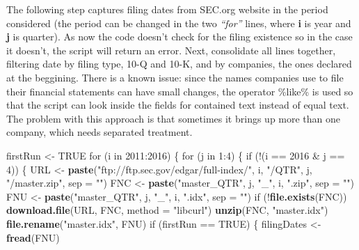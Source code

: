 \documentclass[english,man]{apa6}
\newenvironment{Shaded}{\begin{snugshade}}{\end{snugshade}}
\newcommand{\KeywordTok}[1]{\textcolor[rgb]{0.13,0.29,0.53}{\textbf{{#1}}}}
\newcommand{\DataTypeTok}[1]{\textcolor[rgb]{0.13,0.29,0.53}{{#1}}}
\newcommand{\DecValTok}[1]{\textcolor[rgb]{0.00,0.00,0.81}{{#1}}}
\newcommand{\StringTok}[1]{\textcolor[rgb]{0.31,0.60,0.02}{{#1}}}
\newcommand{\OtherTok}[1]{\textcolor[rgb]{0.56,0.35,0.01}{{#1}}}
\newcommand{\NormalTok}[1]{{#1}}
\begin{document}
The following step captures filing dates from SEC.org website in the
period considered (the period can be changed in the two
\emph{\enquote{for}} lines, where \textbf{i} is year and \textbf{j} is
quarter). As now the code doesn't check for the filing existence so in
the case it doesn't, the script will return an error. Next, consolidate
all lines together, filtering date by filing type, 10-Q and 10-K, and by
companies, the ones declared at the beggining. There is a known issue:
since the names companies use to file their financial statements can
have small changes, the operator \%like\% is used so that the script can
look inside the fields for contained text instead of equal text. The
problem with this approach is that sometimes it brings up more than one
company, which needs separated treatment.

\begin{Shaded}
\begin{Highlighting}[]
\NormalTok{firstRun <-}\StringTok{ }\OtherTok{TRUE}
\NormalTok{for (i in }\DecValTok{2011}\NormalTok{:}\DecValTok{2016}\NormalTok{) \{}
  \NormalTok{for (j in }\DecValTok{1}\NormalTok{:}\DecValTok{4}\NormalTok{) \{}
    \NormalTok{if (!(i ==}\StringTok{ }\DecValTok{2016} \NormalTok{&}\StringTok{ }\NormalTok{j ==}\StringTok{ }\DecValTok{4}\NormalTok{)) \{}
      \NormalTok{URL <-}
\StringTok{        }\KeywordTok{paste}\NormalTok{(}\StringTok{"ftp://ftp.sec.gov/edgar/full-index/"}\NormalTok{,}
              \NormalTok{i,}
              \StringTok{"/QTR"}\NormalTok{,}
              \NormalTok{j,}
              \StringTok{"/master.zip"}\NormalTok{,}
              \DataTypeTok{sep =} \StringTok{""}\NormalTok{)}
      \NormalTok{FNC <-}\StringTok{ }\KeywordTok{paste}\NormalTok{(}\StringTok{"master_QTR"}\NormalTok{, j, }\StringTok{"_"}\NormalTok{, i, }\StringTok{".zip"}\NormalTok{, }\DataTypeTok{sep =} \StringTok{""}\NormalTok{)}
      \NormalTok{FNU <-}\StringTok{ }\KeywordTok{paste}\NormalTok{(}\StringTok{"master_QTR"}\NormalTok{, j, }\StringTok{"_"}\NormalTok{, i, }\StringTok{".idx"}\NormalTok{, }\DataTypeTok{sep =} \StringTok{""}\NormalTok{)}
      \NormalTok{if (!}\KeywordTok{file.exists}\NormalTok{(FNC))}
        \KeywordTok{download.file}\NormalTok{(URL, FNC, }\DataTypeTok{method =} \StringTok{"libcurl"}\NormalTok{)}
      \KeywordTok{unzip}\NormalTok{(FNC, }\StringTok{"master.idx"}\NormalTok{)}
      \KeywordTok{file.rename}\NormalTok{(}\StringTok{"master.idx"}\NormalTok{, FNU)}
      \NormalTok{if (firstRun ==}\StringTok{ }\OtherTok{TRUE}\NormalTok{) \{}
        \NormalTok{filingDates <-}\StringTok{ }\KeywordTok{fread}\NormalTok{(FNU)}

\end{Highlighting}
\end{Shaded}
\end{document}
